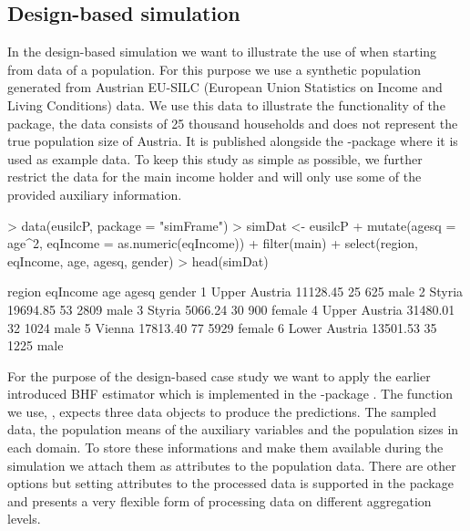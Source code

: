 \documentclass[article]{ajs}
\begin{document}

\subsection{Design-based simulation}

In the design-based simulation we want to illustrate the use of  when starting from data of a population. For this purpose we use a synthetic population generated from Austrian EU-SILC (European Union Statistics on Income and Living Conditions) data. We use this data to illustrate the functionality of the package, the data consists of 25 thousand households and does not represent the true population size of Austria. It is published alongside the -package  \citep{Alf10} where it is used as example data. To keep this study as simple as possible, we further restrict the data for the main income holder and will only use some of the provided auxiliary information.

\begin{Schunk}
\begin{Sinput}
> data(eusilcP, package = "simFrame")
> simDat <- eusilcP %
+   mutate(agesq = age^2, eqIncome = as.numeric(eqIncome)) %
+   filter(main) %
+   select(region, eqIncome, age, agesq, gender)
> head(simDat)
\end{Sinput}
\begin{Soutput}
         region eqIncome age agesq gender
1 Upper Austria 11128.45  25   625   male
2        Styria 19694.85  53  2809   male
3        Styria  5066.24  30   900 female
4 Upper Austria 31480.01  32  1024   male
5        Vienna 17813.40  77  5929 female
6 Lower Austria 13501.53  35  1225   male
\end{Soutput}
\end{Schunk}

For the purpose of the design-based case study we want to apply the earlier introduced BHF estimator which is implemented in the -package  \citep{molina13}. The function we use, , expects three data objects to produce the predictions. The sampled data, the population means of the auxiliary variables and the population sizes in each domain. To store these informations and make them available during the simulation we attach them as attributes to the population data. There are other options but setting attributes to the processed data is supported in the package and presents a very flexible form of processing data on different aggregation levels. 
\end{document}

